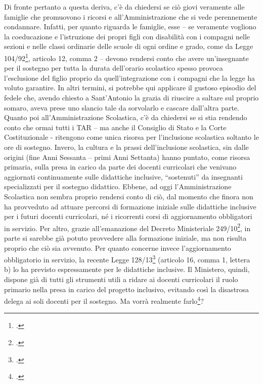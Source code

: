 Di fronte pertanto a questa deriva, c'è da chiedersi se ciò giovi veramente alle famiglie che promuovono i ricorsi e all'Amministrazione che si vede perennemente condannare.
Infatti, per quanto riguarda le famiglie, esse – se veramente vogliono la coeducazione e l'istruzione dei propri figli con disabilità con i compagni nelle sezioni e nelle classi ordinarie delle scuole di ogni ordine e grado, come da Legge 104/92\footcite{Legge_104_92}, articolo 12, comma 2 – devono rendersi conto che avere un'insegnante per il sostegno per tutta la durata dell'orario scolastico spesso provoca l'esclusione del figlio proprio da quell'integrazione con i compagni che la legge ha voluto garantire. In altri termini, si potrebbe qui applicare il gustoso episodio del fedele che, avendo chiesto a Sant'Antonio la grazia di riuscire a saltare sul proprio somaro, aveva prese uno slancio tale da sorvolarlo e cascare dall'altra parte.
Quanto poi all'Amministrazione Scolastica, c'è da chiedersi se si stia rendendo conto che ormai tutti i TAR – ma anche il Consiglio di Stato e la Corte Costituzionale - ritengono come unica risorsa per l'inclusione scolastica soltanto le ore di sostegno.
Invero, la cultura e la prassi dell'inclusione scolastica, sin dalle origini (fine Anni Sessanta -- primi Anni Settanta) hanno puntato, come risorsa primaria, sulla presa in carico da parte dei docenti curricolari che venivano aggiornati continuamente sulle didattiche inclusive, “sostenuti” da insegnanti specializzati per il sostegno didattico. Ebbene, ad oggi l'Amministrazione Scolastica non sembra proprio rendersi conto di ciò, dal momento che finora non ha provveduto ad attuare percorsi di formazione iniziale sulle didattiche inclusive per i futuri docenti curricolari, né i ricorrenti corsi di aggiornamento obbligatori in servizio.
Per altro, grazie all'emanazione del Decreto Ministeriale 249/10\footcite{DM_249_2010}, in parte si sarebbe già potuto provvedere alla formazione iniziale, ma non risulta proprio che ciò sia avvenuto. Per quanto concerne invece l'aggiornamento obbligatorio in servizio, la recente Legge 128/13\footcite{Legge_128_2013} (articolo 16, comma 1, lettera b) lo ha previsto espressamente per le didattiche inclusive.
Il Ministero, quindi, dispone già di tutti gli strumenti utili a ridare ai docenti curricolari il ruolo primario nella presa in carico del progetto inclusivo, evitando così la disastrosa delega ai soli docenti per il sostegno. Ma vorrà realmente farlo\footcite{Nocera2014b}?
